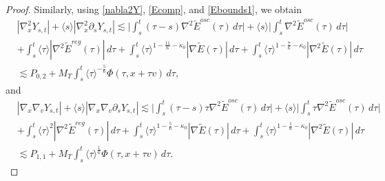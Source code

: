 \documentclass[reqno,11pt]{amsart}
\numberwithin{equation}{section}
\begin{document}
\begin{proof}
	Similarly, using \eqref{nabla2Y},
	\eqref{Ecomp}, and \eqref{Ebounds1}, we obtain
	\begin{equation}\label{Ysu4}
		\begin{split}
			&|\nabla_x^2Y_{s,t}|+\langle s\rangle|\nabla_x^2\partial_sY_{s,t}|
			\lesssim\Big|\int_s^t(\tau-s)\nabla^2\widetilde E^{osc}(\tau)\,d\tau\Big|
			+\langle s\rangle\Big|\int_s^t\nabla^2\widetilde E^{osc}(\tau)\,d\tau\Big|\\
			&+\int_s^t\langle\tau\rangle|\nabla^2\widetilde E^{reg}(\tau)|\,d\tau+\int_s^t\langle\tau\rangle^{1-\frac{11}{6}-\kappa_0}
			|\nabla\widetilde E(\tau)|\,d\tau+\int_s^t\langle\tau\rangle^{1-\frac{7}{6}-\kappa_0}|\nabla^2\widetilde E(\tau)|\,d\tau\\
			&\lesssim
			P_{0,2}
			+M_T\int_s^t
			\langle\tau\rangle^{-\frac56}
			\Phi(\tau,x+\tau v)\,d\tau,
		\end{split}
	\end{equation}
	and
	\begin{equation}\label{Ysu5}
		\begin{split}
			&|\nabla_x\nabla_vY_{s,t}|+\langle s\rangle|\nabla_x\nabla_v\partial_sY_{s,t}|
			\lesssim\Big|\int_s^t(\tau-s)\tau
			\nabla^2\widetilde E^{osc}(\tau)\,d\tau\Big|+\langle s\rangle
			\Big|\int_s^t\tau\nabla^2\widetilde E^{osc}(\tau)\,d\tau\Big|\\
			&+\int_s^t\langle\tau\rangle^2
			|\nabla^2\widetilde E^{reg}(\tau)|\,d\tau+\int_s^t\langle\tau\rangle^{1-\frac56-\kappa_0}
			|\nabla\widetilde E(\tau)|\,d\tau+\int_s^t
			\langle\tau\rangle^{1-\frac16-\kappa_0}
			|\nabla^2\widetilde E(\tau)|\,d\tau\\
			&\lesssim P_{1,1}+M_T\int_s^t\langle\tau\rangle^{\frac16}\Phi(\tau,x+\tau v)\,d\tau.
		\end{split}
	\end{equation}
	

\end{proof}
\end{document}
